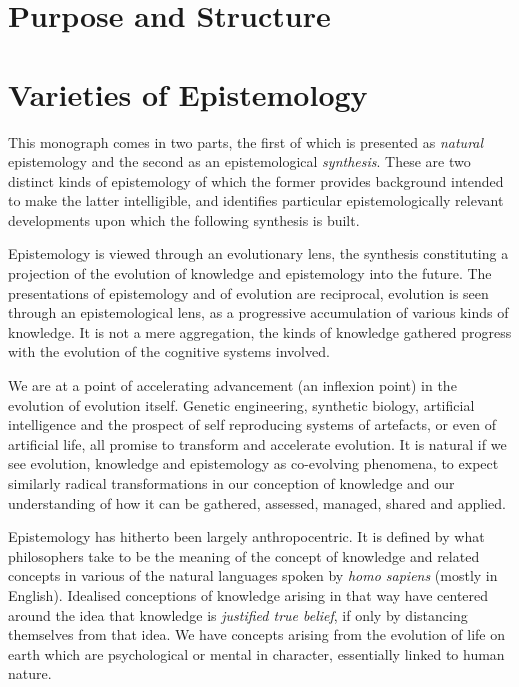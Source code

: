 \documentclass[10pt,titlepage]{book}
\begin{document}
\section{Purpose and Structure}

\section{Varieties of Epistemology}

This monograph comes in two parts, the first of which is presented as \emph{natural} epistemology and the second as an epistemological \emph{synthesis}.
These are two distinct kinds of epistemology of which the former provides background intended to make the latter intelligible, and identifies particular epistemologically relevant developments upon which the following synthesis is built.

Epistemology is viewed through an evolutionary lens, the synthesis constituting a projection of the evolution of knowledge and epistemology into the future.
The presentations of epistemology and of evolution are reciprocal,
evolution is seen through an epistemological lens, as a progressive accumulation of various kinds of knowledge.
It is not a mere aggregation, the kinds of knowledge gathered progress with the evolution of the cognitive systems involved.

 We are at a point of accelerating advancement (an inflexion point) in the evolution of evolution itself.
Genetic engineering, synthetic biology, artificial intelligence and the prospect of self reproducing systems of artefacts, or even of artificial life, all promise to transform and accelerate evolution.
It is natural if we see evolution, knowledge and epistemology as co-evolving phenomena, to expect similarly radical transformations in our conception of knowledge and our understanding of how it can be gathered, assessed, managed, shared and applied.

Epistemology has hitherto been largely anthropocentric.
It is defined by what philosophers take to be the meaning of the concept of knowledge and related concepts in various of the natural languages spoken by \emph{homo sapiens} (mostly in English).
Idealised conceptions of knowledge arising in that way have centered around the idea that knowledge is \emph{justified true belief}, if only by distancing themselves from that idea.
We have concepts arising from the evolution of life on earth which are psychological or mental in character, essentially linked to human nature.
\end{document}
